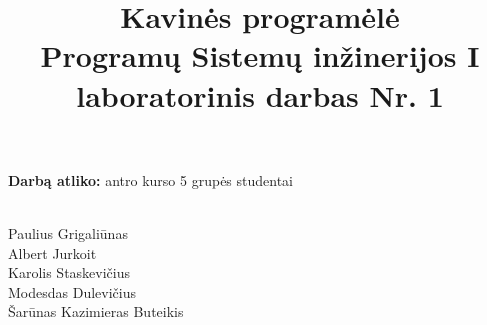 \documentclass[12pt]{article}
\begin{document}

\title{\huge
{Kavinės programėlė}\\
{\large Programų Sistemų inžinerijos I laboratorinis darbas Nr. 1}}
\maketitle

\large
\begin{flushright}
\textbf{Darbą atliko:} antro kurso 5 grupės studentai\\\

Paulius Grigaliūnas\\
Albert Jurkoit\\
Karolis Staskevičius\\
Modesdas Dulevičius\\
Šarūnas Kazimieras Buteikis
\end{flushright}
\end{document}
